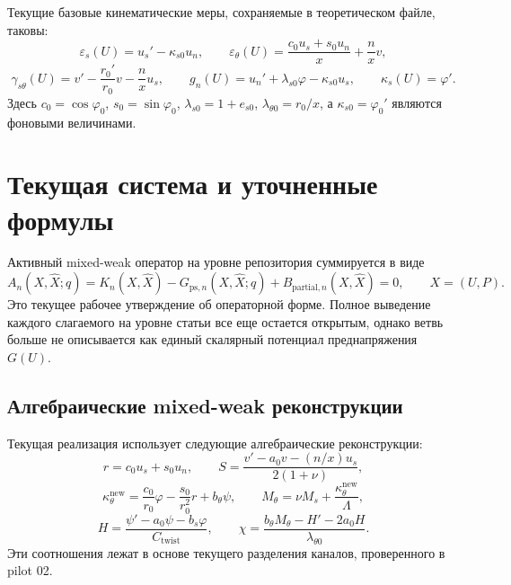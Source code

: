 \documentclass[11pt,a4paper]{article}
\begin{document}
Текущие базовые кинематические меры, сохраняемые в теоретическом файле, таковы:
\[
\varepsilon_s(U) = u_s' - \kappa_{s0}u_n,
\qquad
\varepsilon_\theta(U) = \frac{c_0u_s+s_0u_n}{x} + \frac{n}{x}v,
\]
\[
\gamma_{s\theta}(U) = v' - \frac{r_0'}{r_0}v - \frac{n}{x}u_s,
\qquad
g_n(U) = u_n' + \lambda_{s0}\varphi - \kappa_{s0}u_s,
\qquad
\kappa_s(U) = \varphi'.
\]
Здесь $c_0=\cos\varphi_0$, $s_0=\sin\varphi_0$,
$\lambda_{s0}=1+e_{s0}$, $\lambda_{\theta0}=r_0/x$,
а $\kappa_{s0}=\varphi_0'$ являются фоновыми величинами.

\section{Текущая система и уточненные формулы}
Активный mixed-weak оператор на уровне репозитория суммируется в виде
\[
A_n(X, \widehat X; q)
 = K_n(X, \widehat X) - G_{\mathrm{ps},n}(X, \widehat X; q)
   + B_{\mathrm{partial},n}(X, \widehat X) = 0,
\qquad X=(U,P).
\]
Это текущее рабочее утверждение об операторной форме.
Полное выведение каждого слагаемого на уровне статьи все еще остается
открытым, однако ветвь больше не описывается как единый скалярный потенциал
преднапряжения $G(U)$.

\subsection{Алгебраические mixed-weak реконструкции}
Текущая реализация использует следующие алгебраические реконструкции:
\[
r = c_0u_s+s_0u_n,
\qquad
S = \frac{v' - a_0v - (n/x)u_s}{2(1+\nu)},
\]
\[
\kappa_\theta^{\mathrm{new}}
 = \frac{c_0}{r_0}\varphi - \frac{s_0}{r_0^2}r + b_\theta\psi,
\qquad
M_\theta = \nu M_s + \frac{\kappa_\theta^{\mathrm{new}}}{\Lambda},
\]
\[
H = \frac{\psi' - a_0\psi - b_s\varphi}{C_{\mathrm{twist}}},
\qquad
\chi = \frac{b_\theta M_\theta - H' - 2a_0H}{\lambda_{\theta0}}.
\]
Эти соотношения лежат в основе текущего разделения каналов, проверенного в
pilot 02.
\end{document}
